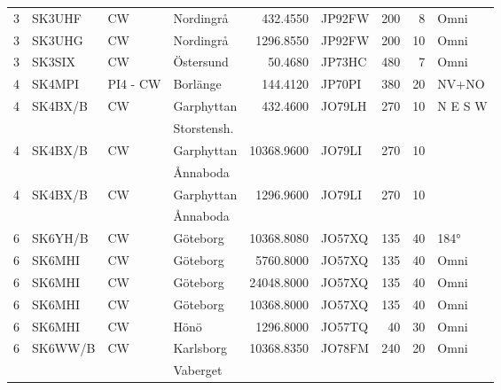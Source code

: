 \begin{landscape}
\begin{longtable}{rlllrlrrl}
	       3 & SK3UHF     & CW       & Nordingrå    &     432.4550 & JP92FW      &      200 &        8 & Omni         \\
	       3 & SK3UHG     & CW       & Nordingrå    &    1296.8550 & JP92FW      &      200 &       10 & Omni         \\
	       3 & SK3SIX     & CW       & Östersund    &      50.4680 & JP73HC      &      480 &        7 & Omni         \\
	       4 & SK4MPI     & PI4 - CW & Borlänge     &     144.4120 & JP70PI      &      380 &       20 & NV+NO        \\
	       4 & SK4BX/B    & CW       & Garphyttan   &     432.4600 & JO79LH      &      270 &       10 & N E S W      \\
	         &            &          & Storstensh.  &              &             &          &          &              \\
	       4 & SK4BX/B    & CW       & Garphyttan   &   10368.9600 & JO79LI      &      270 &       10 &              \\
	         &            &          & Ånnaboda     &              &             &          &          &              \\
	       4 & SK4BX/B    & CW       & Garphyttan   &    1296.9600 & JO79LI      &      270 &       10 &              \\
	         &            &          & Ånnaboda     &              &             &          &          &              \\
	       6 & SK6YH/B    & CW       & Göteborg     &   10368.8080 & JO57XQ      &      135 &       40 & 184°         \\
	       6 & SK6MHI     & CW       & Göteborg     &    5760.8000 & JO57XQ      &      135 &       40 & Omni         \\
	       6 & SK6MHI     & CW       & Göteborg     &   24048.8000 & JO57XQ      &      135 &       40 & Omni         \\
	       6 & SK6MHI     & CW       & Göteborg     &   10368.8000 & JO57XQ      &      135 &       40 & Omni         \\
	       6 & SK6MHI     & CW       & Hönö         &    1296.8000 & JO57TQ      &       40 &       30 & Omni         \\
	       6 & SK6WW/B    & CW       & Karlsborg    &   10368.8350 & JO78FM      &      240 &       20 & Omni         \\
	         &            &          & Vaberget     &              &             &          &          &              \\

\end{longtable}
\end{landscape}
